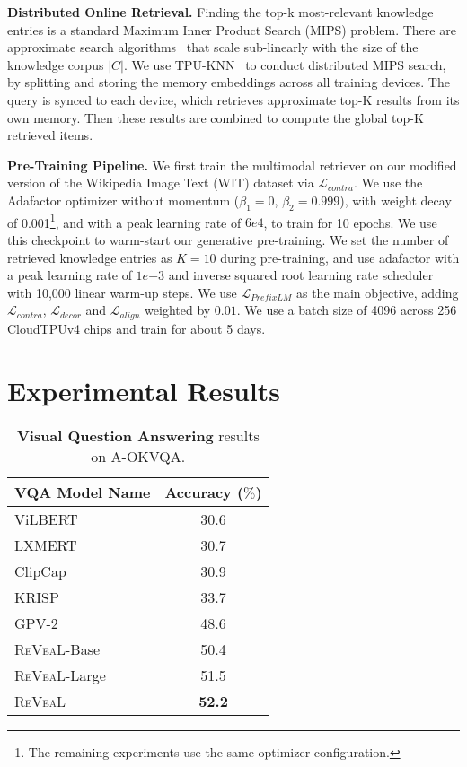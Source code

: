 \documentclass[10pt,twocolumn,letterpaper]{article}
\newcommand{\method}{R\textsc{e}V\textsc{ea}L\xspace}
\begin{document}
\textbf{Distributed Online Retrieval.}
Finding the top-k most-relevant knowledge entries is a standard Maximum Inner Product Search (MIPS) problem. There are approximate search algorithms~\cite{DBLP:conf/nips/Shrivastava014, DBLP:journals/corr/abs-2206-14286} that scale sub-linearly with the size of the knowledge corpus $|C|$. We use TPU-KNN~\cite{DBLP:journals/corr/abs-2206-14286} to conduct distributed MIPS search, by splitting and storing the memory embeddings across all training devices. The query is synced to each device, which retrieves approximate top-K results from its own memory. Then these results are combined to compute the global top-K retrieved items. 


\textbf{Pre-Training Pipeline.}
We first train the multimodal retriever on our modified version of the Wikipedia Image Text (WIT) dataset via $\mathcal{L}_{contra}$. We use the Adafactor optimizer without momentum ($\beta_1=0$, $\beta_2=0.999$), with weight decay of 0.001\footnote{The remaining experiments use the same optimizer configuration.}, and with a peak learning rate of $6e4$, to train for 10 epochs. We use this checkpoint to warm-start our generative pre-training.
 We set the number of retrieved knowledge entries as $K=10$ during pre-training, and use adafactor with a peak learning rate of $1e{-3}$ and inverse squared root learning rate scheduler with 10,000 linear warm-up steps. We use $\mathcal{L}_{PrefixLM}$ as the main objective, adding $\mathcal{L}_{contra}$, $\mathcal{L}_{decor}$ and $\mathcal{L}_{align}$ weighted by $0.01$. We use a batch size of 4096 across 256 CloudTPUv4 chips and train for about 5 days.



 \section{Experimental Results}\label{sec:experiment}



\begin{table}[t!]
\centering
\small
\begin{tabular}{l|c} \toprule
\textbf{VQA Model Name} & \textbf{Accuracy ($\%$)}\\ \midrule
ViLBERT~\cite{DBLP:conf/nips/LuBPL19}  & 30.6 \\
LXMERT~\cite{DBLP:conf/emnlp/TanB19} & 30.7 \\
ClipCap~\cite{DBLP:journals/corr/abs-2111-09734} & 30.9 \\
KRISP~\cite{DBLP:conf/cvpr/MarinoCP0R21} & 33.7 \\ 
GPV-2~\cite{DBLP:conf/eccv/KamathCGKHK22} & 48.6 \\ \midrule
\method-Base & 50.4  \\
\method-Large& 51.5  \\
\method & \textbf{52.2}  \\\bottomrule
\end{tabular}
    \vspace{-.1in}
\caption{\textbf{Visual Question Answering} results on A-OKVQA.}
\label{tab:aokvqa}
\end{table}
\end{document}
